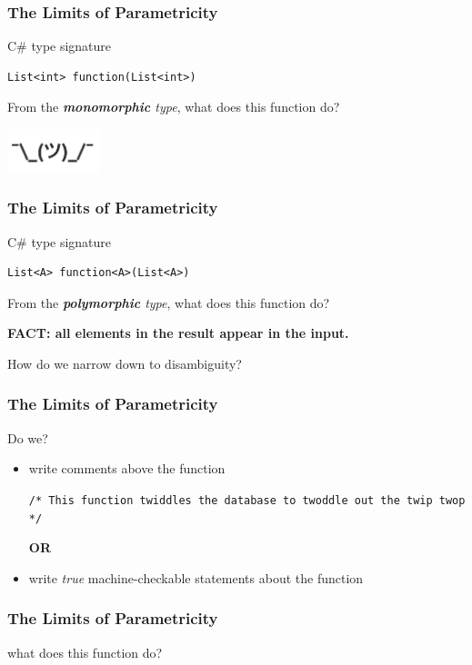 \begin{frame}[fragile]
\frametitle{The Limits of Parametricity}
\begin{block}{C\# type signature}
\begin{lstlisting}[style=csharp]
List<int> function(List<int>)
\end{lstlisting}
From the \emph{\textbf{monomorphic} type}, what does this function do?
\end{block}
\includegraphics[width=0.2\textwidth]{image/shrug.png}
\end{frame}

\begin{frame}[fragile]
\frametitle{The Limits of Parametricity}
\begin{block}{C\# type signature}
\begin{lstlisting}[style=csharp]
List<A> function<A>(List<A>)
\end{lstlisting}
From the \emph{\textbf{polymorphic} type}, what does this function do?
\end{block}
\large{\textbf{FACT: all elements in the result appear in the input.}}

\tiny{How do we narrow down to disambiguity?}
\end{frame}

\begin{frame}[fragile]
\frametitle{The Limits of Parametricity}
\begin{block}{Do we?}
\begin{itemize}
  \item<1-> write comments above the function

            \lstinline[style=csharp]{/* This function twiddles the database to twoddle out the twip twop */}

            \textbf{OR}
  \item<2-> write \emph{true} machine-checkable statements about the function
\end{itemize}
\end{block}
\end{frame}

\begin{frame}[fragile]
\frametitle{The Limits of Parametricity}
\begin{block}{what does this function do?}

\end{block}
\end{frame}

